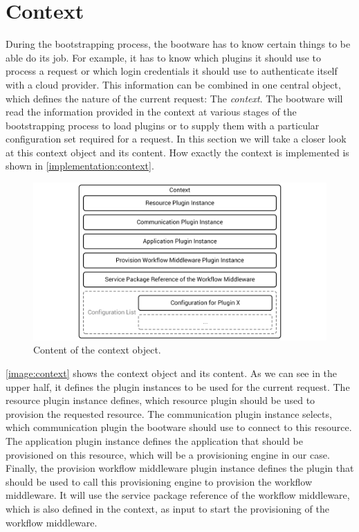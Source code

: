 \section{Context}
\label{design:context}

During the bootstrapping process, the bootware has to know certain things to be able do its job.
For example, it has to know which plugins it should use to process a request or which login credentials it should use to authenticate itself with a cloud provider.
This information can be combined in one central object, which defines the nature of the current request: The \textit{context}.
The bootware will read the information provided in the context at various stages of the bootstrapping process to load plugins or to supply them with a particular configuration set required for a request.
In this section we will take a closer look at this context object and its content.
How exactly the context is implemented is shown in \autoref{implementation:context}.

\begin{figure}[!htbp]
	\centering
	\includegraphics[resolution=600]{design/assets/context}
	\caption{Content of the context object.}
	\label{image:context}
\end{figure}

\autoref{image:context} shows the context object and its content.
As we can see in the upper half, it defines the plugin instances to be used for the current request.
The resource plugin instance defines, which resource plugin should be used to provision the requested resource.
The communication plugin instance selects, which communication plugin the bootware should use to connect to this resource.
The application plugin instance defines the application that should be provisioned on this resource, which will be a provisioning engine in our case.
Finally, the provision workflow middleware plugin instance defines the plugin that should be used to call this provisioning engine to provision the workflow middleware.
It will use the service package reference of the workflow middleware, which is also defined in the context, as input to start the provisioning of the workflow middleware.

